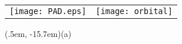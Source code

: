 \documentclass[varwidth=30em]{standalone}
\begin{document}
\begin{tabular}[c]{p{22em}p{50em}}
\shortstack[c]{
 \texttt{[image: PAD.eps]}\\[0.1cm]}%
& 
\shortstack[c]{
\texttt{[image: orbital]}\\[0.1cm]}%
\end{tabular}
\begin{textblock*}{5em}(.5em, -15.7em)\sf (a)\end{textblock*}
\end{document}
